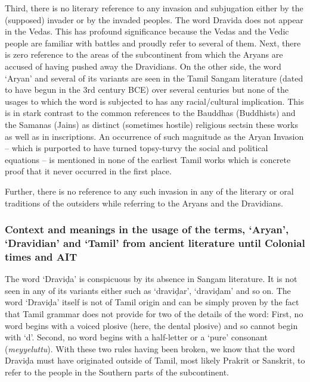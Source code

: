 Third, there is no literary reference to any invasion and subjugation either by the (supposed) invader or by the invaded peoples. The word Dravida does not appear in the Vedas. This has profound significance because the Vedas and the Vedic people are familiar with battles and proudly refer to several of them. Next, there is zero reference to the areas of the subcontinent from which the Aryans are accused of having pushed away the Dravidians. On the other side, the word ‘Aryan’ and several of its variants are seen in the Tamil Sangam literature (dated to have begun in the 3rd century BCE) over several centuries but none of the usages to which the word is subjected to has any racial/cultural implication. This is in stark contrast to the common references to the Bauddhas (Buddhists) and the Samanas (Jains) as distinct (sometimes hostile) religious sectsin these works as well as in inscriptions. An occurrence of such magnitude as the Aryan Invasion – which is purported to have turned topsy-turvy the social and political equations – is mentioned in none of the earliest Tamil works which is concrete proof that it never occurred in the first place.

Further, there is no reference to any such invasion in any of the literary or oral traditions of the outsiders while referring to the Aryans and the Dravidians.

\newpage


\subsubsection{Context and meanings in the usage of the terms, ‘Aryan’, ‘Dravidian’ and ‘Tamil’ from ancient literature until Colonial times and AIT}

The word ‘Draviḍa’ is conspicuous by its absence in Sangam literature. It is not seen in any of its variants either such as ‘draviḍar’, ‘draviḍam’ and so on. The word ‘Draviḍa’ itself is not of Tamil origin and can be simply proven by the fact that Tamil grammar does not provide for two of the details of the word: First, no word begins with a voiced plosive (here, the dental plosive) and so cannot begin with ‘d’. Second, no word begins with a half-letter or a ‘pure’ consonant (\textit{meyyeluttu}). With these two rules having been broken, we know that the word Draviḍa must have originated outside of Tamil, most likely Prakrit or Sanskrit, to refer to the people in the Southern parts of the subcontinent.

